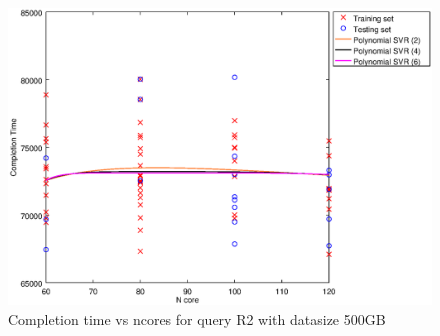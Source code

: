 
\begin {figure}[hbtp]
\centering
\includegraphics[width=\textwidth]{output/R2_500_ONLY_1_OVER_NCORES/plot_R2_500_bestmodels.eps}
\caption{Completion time vs ncores for query R2 with datasize 500GB}
\label{fig:all_nonlinear_R2_500}
\end {figure}
